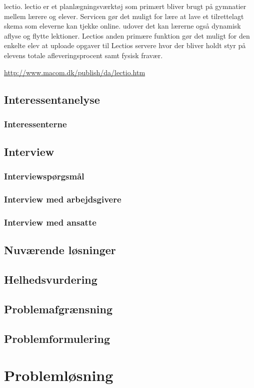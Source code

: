 \documentclass[11pt, twoside, a4paper, openright]{report}
\begin{document}
lectio.
lectio er et planlægningsværktøj som primært bliver brugt på gymnatier mellem lærere og elever. Servicen gør det muligt for lære at lave et tilrettelagt skema som eleverne kan tjekke online. udover det kan lærerne også dynamisk aflyse og flytte lektioner. Lectios anden primære funktion gør det muligt for den enkelte elev at uploade opgaver til Lectios servere hvor der bliver holdt styr på elevens totale afleveringsprocent samt fysisk fravær.

\url{http://www.macom.dk/publish/da/lectio.htm}

	\section{Interessentanelyse}
		\subsection{Interessenterne}
	\section{Interview}
		\subsection{Interviewspørgsmål}
		\subsection{Interview med arbejdsgivere}
		\subsection{Interview med ansatte}
	\section{Nuværende løsninger}
	\section{Helhedsvurdering}
	\section{Problemafgrænsning}
	\section{Problemformulering}

\chapter{Problemløsning}
\end{document}
